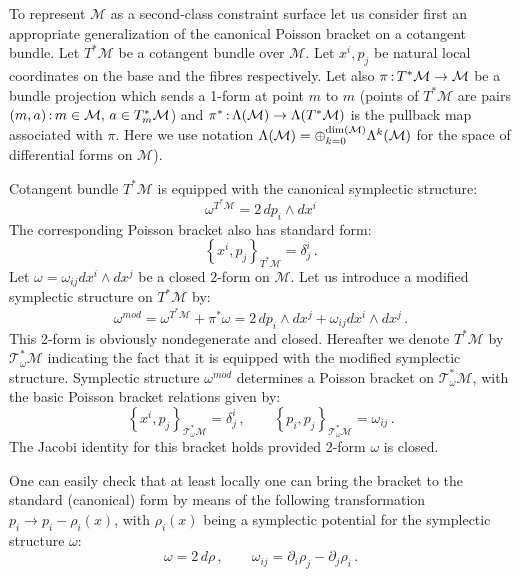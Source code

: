 \documentclass[a4paper,11pt]{amsart}
\numberwithin{thm}{section} %
\numberwithin{equation}{section} %
\numberwithin{figure}{section} %
\newcommand{\pb}[2]{\left\{{}#1{},{}#2{}\right\}}
\renewcommand{\dim}[1]{{\rm dim}(#1)}
\renewcommand{\:}{{\rm\, :\,}}
\def\d{\partial}
\def\mod{{\mathcal T}^*_\omega}
\def\manM{{\mathcal M}}
\begin{document}
To represent $\manM$ as a second-class constraint surface let us
consider first an appropriate generalization of the canonical
Poisson bracket on a cotangent bundle.  Let $T^*\manM$ be a
cotangent bundle over $\manM$.  Let $x^i,p_j$ be natural local
coordinates on the base and
the fibres respectively. Let also $\pi\: T^*\manM \to \manM$ be a
bundle projection which sends a 1-form at point $m$ to $m$ (points of
$T^*\manM$ are pairs $(m,a)\: m \in \manM,\, a \in T^*_m \manM$)
and $\pi^* \: \Lambda(\manM) \to \Lambda(T^*\manM)$
is the pullback map associated with $\pi$.
Here we use notation
$\Lambda(\manM)=\oplus_{k=0}^{\dim{\manM}}\Lambda^k(\manM)$
for the space of differential forms on $\manM$).


Cotangent bundle $T^*\manM$ is equipped with the canonical symplectic
structure:
$$
\omega^{T^*\manM}=2\,dp_i \wedge dx^i
$$
The corresponding Poisson bracket also has standard
form:
$$
  \pb{x^i}{p_j}_{T^*\manM}=\delta^i_j\,.
$$
Let $\omega=\omega_{ij} dx^i \wedge dx^j$ be a closed 2-form on
$\manM$.  Let us introduce a modified symplectic structure on
$T^*\manM$ by:
\begin{equation}
  \label{eq:mod-symplectic}
\omega^{mod}=
\omega^{T^*\manM}+\pi^* \omega=2\,dp_i \wedge dx^j + \omega_{ij} dx^i
\wedge dx^j\,.
\end{equation}
This 2-form is obviously nondegenerate and closed.
Hereafter we denote $T^*\manM$ by $\mod\manM$ indicating the fact that
it is equipped with the modified symplectic structure.
Symplectic structure $\omega^{mod}$ determines a Poisson bracket
on $\mod\manM$, with the basic Poisson bracket relations given by:
\begin{equation}
  \label{eq:mod-PB}
\pb{x^i}{p_j}_{\mod\manM}=\delta^i_j\,, \qquad
\pb{p_i}{p_j}_{\mod\manM}=\omega_{ij}\,.
\end{equation}
The Jacobi identity for this bracket holds provided 2-form
$\omega$ is closed.

One can easily check that at least locally one can bring the bracket
to the standard (canonical) form by means of the following transformation
$p_i \to p_i-\rho_i(x)$, with $\rho_i(x)$ being a symplectic
potential for the symplectic structure $\omega$:
\begin{equation}
  \omega=2\, d\rho\,, \qquad \omega_{ij}=\d_i \rho_j -\d_j\rho_i\,.
\end{equation}
\end{document}
